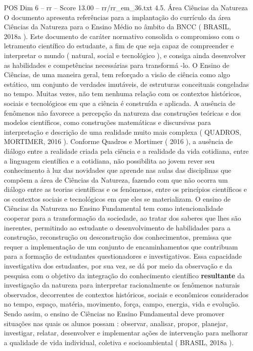 \begin{textsample}{POS Dim 6 – rr – Score 13.00 – rr/rr\_em\_36.txt}  \label{ex:f6_pos_212}
4.5.
Área Ciências da Natureza O documento apresenta referências para a implantação do currículo da área Ciências da Natureza para o Ensino Médio no âmbito da BNCC ( BRASIL, 2018a ).
Este documento de caráter normativo consolida o compromisso com o letramento científico do estudante, a fim de que seja capaz de compreender e interpretar o mundo ( natural, social e tecnológico ), e consiga ainda desenvolver as habilidades e competências necessárias para transformá -lo.
O Ensino de Ciências, de uma maneira geral, tem reforçado a visão de ciência como algo estático, um conjunto de verdades imutáveis, de estruturas conceituais congeladas no tempo.
Muitas vezes, não tem nenhuma relação com os contextos históricos, sociais e tecnológicos em que a ciência é construída e aplicada.
A ausência de fenômenos não favorece a percepção da natureza das construções teóricas e dos modelos científicos, como construções matemáticas e discursivas para interpretação e descrição de uma realidade muito mais complexa ( QUADROS, MORTIMER, 2016 ).
Conforme Quadros e Mortimer ( 2016 ), a ausência de diálogo entre a realidade criada pela ciência e a realidade da vida cotidiana, entre a linguagem científica e a cotidiana, não possibilita ao jovem rever seu conhecimento à luz das novidades que aprende nas aulas das disciplinas que compõem a área de Ciências da Natureza, fazendo com que não ocorra um diálogo entre as teorias científicas e os fenômenos, entre os princípios científicos e os contextos sociais e tecnológicos em que eles se materializam.
O ensino de Ciências da Natureza no Ensino Fundamental tem como intencionalidade cooperar para a transformação da sociedade, ao tratar dos saberes que lhes são inerentes, permitindo ao estudante o desenvolvimento de habilidades para a construção, reconstrução ou desconstrução dos conhecimentos, premissa que requer a implementação de um conjunto de encaminhamentos que contribuam para a formação de estudantes questionadores e investigativos.
Essa capacidade investigativa dos estudantes, por sua vez, se dá por meio da observação e da pesquisa com o objetivo da integração do conhecimento científico \textbf{resultante} da investigação da natureza para interpretar racionalmente os fenômenos naturais observados, decorrentes de contextos históricos, sociais e econômicos considerados no tempo, espaço, matéria, movimento, força, campo, energia, vida e evolução.
Sendo assim, o ensino de Ciências no Ensino Fundamental deve promover situações nas quais os alunos possam : observar, analisar, propor, planejar, investigar, relatar, desenvolver e implementar ações de intervenção para melhorar a qualidade de vida individual, coletiva e socioambiental ( BRASIL, 2018a ).

\end{textsample}
